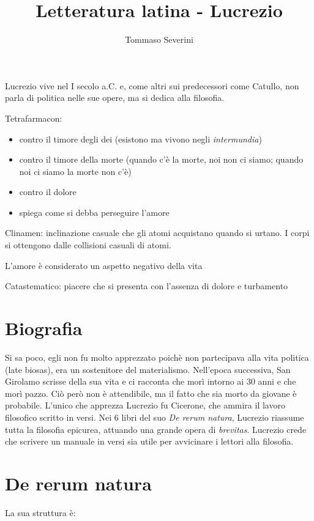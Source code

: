 \documentclass[10pt,a4paper]{article}
\author{Tommaso Severini}
\title{Letteratura latina -  Lucrezio}
\begin{document}
	\maketitle
	
	Lucrezio vive nel I secolo a.C. e, come altri sui predecessori come Catullo, non parla di politica nelle sue opere, ma si dedica alla filosofia.
	
	Tetrafarmacon:
	\begin{itemize}
		\item contro il timore degli dei (esistono ma vivono negli \textit{intermundia})
		\item contro il timore della morte (quando c'è la morte, noi non ci siamo; quando noi ci siamo la morte non c'è)
		\item contro il dolore
		\item spiega come si debba perseguire l'amore
	\end{itemize}

	Clinamen: inclinazione casuale che gli atomi acquistano quando si urtano.
	I corpi si ottengono dalle collisioni casuali di atomi.
	
	L'amore è considerato un aspetto negativo della vita
	
	Catastematico: piacere che si presenta con l'assenza di dolore e turbamento
	
	\section{Biografia}
	
	Si sa poco, egli non fu molto apprezzato poichè non partecipava alla vita politica (late biosas), era un sostenitore del materialismo. Nell'epoca successiva, San Girolamo scrisse della sua vita e ci racconta che morì intorno ai 30 anni e che morì pazzo. Ciò però non è attendibile, ma il fatto che sia morto da giovane è probabile. L'unico che apprezza Lucrezio fu Cicerone, che ammira il lavoro filosofico scritto in versi. Nei 6 libri del suo \textit{De rerum natura}, Lucrezio riassume tutta la filosofia epicurea, attuando una grande opera di \textit{brevitas}. Lucrezio crede che scrivere un manuale in versi sia utile per avvicinare i lettori alla filosofia.
	
	\section{De rerum natura}
	
	La sua struttura è:
	
\end{document}

